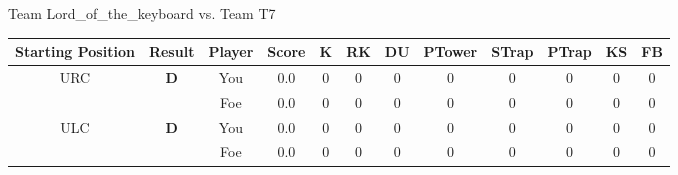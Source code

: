 \documentclass[a4paper,12pt]{article}
\begin{document}
  \vspace*{2em}
  \par {\large {\color{Gray} Team} Lord\_of\_the\_keyboard {\color{Gray}
      vs. Team} T7}
  \newline
  \begin{tabular}[t]{| c | c | c | c | c | c | c | c | c | c | c | c
      |}
    \hline
    Starting Position & \textbf{Result} & Player & \textbf{Score} & K & RK & DU & PTower & STrap & PTrap & KS & FB \\
    
      
                      
      
        \hline
        \multirow{2}{*}{  URC
             } &
              \multirow{2}{*}{  
                  \textbf{D}  } & 
                    \cellcolor{yellow!25} You & \cellcolor{yellow!25} 0.0 & \cellcolor{yellow!25} 0 &
                    \cellcolor{yellow!25} 0 & \cellcolor{yellow!25} 0 & \cellcolor{yellow!25} 0 &
                    \cellcolor{yellow!25} 0 & \cellcolor{yellow!25} 0 & \cellcolor{yellow!25} 0 &
                    \cellcolor{yellow!25} 0 \\
                    \cline{3-12}
                    & & \cellcolor{red!15} Foe & \cellcolor{red!15} 0.0 & \cellcolor{red!15} 0 & \cellcolor{red!15}
                    0 & \cellcolor{red!15} 0
                    & \cellcolor{red!15} 0 & \cellcolor{red!15}
                    0 & \cellcolor{red!15} 0 
                    & \cellcolor{red!15} 0 & \cellcolor{red!15}
                    0 \\
                    
                      
      
                      
      
                      
      
                      
      
                      
      
                      
      
                      
      
        \hline
        \multirow{2}{*}{  ULC  } &
              \multirow{2}{*}{  
                  \textbf{D}  } & 
                    \cellcolor{yellow!25} You & \cellcolor{yellow!25} 0.0 & \cellcolor{yellow!25} 0 &
                    \cellcolor{yellow!25} 0 & \cellcolor{yellow!25} 0 & \cellcolor{yellow!25} 0 &
                    \cellcolor{yellow!25} 0 & \cellcolor{yellow!25} 0 & \cellcolor{yellow!25} 0 &
                    \cellcolor{yellow!25} 0 \\
                    \cline{3-12}
                    & & \cellcolor{red!15} Foe & \cellcolor{red!15} 0.0 & \cellcolor{red!15} 0 & \cellcolor{red!15}
                    0 & \cellcolor{red!15} 0
                    & \cellcolor{red!15} 0 & \cellcolor{red!15}
                    0 & \cellcolor{red!15} 0 
                    & \cellcolor{red!15} 0 & \cellcolor{red!15}
                    0 \\
                    

\end{tabular}
\end{document}
